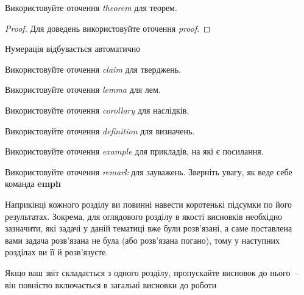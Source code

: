 \begin{theorem}
Використовуйте оточення \emph{theorem} для теорем.
\end{theorem}
\begin{proof}
Для доведень використовуйте оточення \emph{proof}.
\end{proof}
\begin{theorem}
Нумерація відбувається автоматично
\end{theorem}
\begin{claim}
Використовуйте оточення \emph{claim} для тверджень.
\end{claim}
\begin{lemma}
Використовуйте оточення \emph{lemma} для лем.
\end{lemma}
\begin{corollary}
Використовуйте оточення \emph{corollary} для наслідків.
\end{corollary}
\begin{definition}
Використовуйте оточення \emph{definition} для визначень.
\end{definition}
\begin{example}
Використовуйте оточення \emph{example} для прикладів, на які є посилання.
\end{example}
\begin{remark}
Використовуйте оточення \emph{remark} для зауважень. Зверніть увагу, як
веде себе команда \textbf{emph}
\end{remark}


\chapconclude{\ref{chap:review}}

Наприкінці кожного розділу ви повинні навести коротенькі підсумки по його
результатах. Зокрема, для оглядового розділу в якості висновків необхідно
зазначити, які задачі у даній тематиці вже були розв'язані, а саме
поставлена вами задача розв'язана не була (або розв'язана погано), тому у
наступних розділах ви її й розв'язуєте.

Якщо ваш звіт складається з одного розділу, пропускайте висновок до
нього~-- він повністю включається в загальні висновки до роботи
